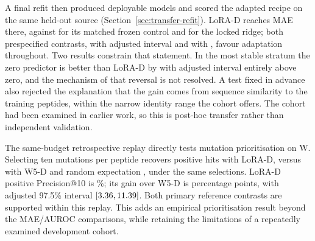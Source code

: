 A final refit then produced deployable models and scored the adapted recipe on the same held-out
source (Section~\ref{sec:transfer-refit}). LoRA-D reaches MAE \nTLoraMae{} there, against
\nTFrozenMae{} for its matched frozen control and \nTWfiveMae{} for the locked ridge; both
prespecified contrasts, \nTDeltaFrozen{} with adjusted interval \nTDeltaFrozenCI{} and
\nTDeltaWfive{} with \nTDeltaWfiveCI{}, favour adaptation throughout. Two results constrain that
statement. In the most stable stratum the zero predictor is better than LoRA-D by \nTGtFiveDelta{}
with adjusted interval \nTGtFiveCI{} entirely above zero, and the mechanism of that reversal is
not resolved. A test fixed in advance also rejected the explanation that the gain comes from
sequence similarity to the training peptides, within the narrow identity range the cohort offers.
The cohort had been examined in earlier work, so this is post-hoc transfer rather than independent
validation.

The same-budget retrospective replay directly tests mutation prioritisation on W. Selecting ten
mutations per peptide recovers \nPriorityLoraHits{} positive hits with LoRA-D, versus
\nPriorityWfiveHits{} with W5-D and random expectation \nPriorityRandomHits{}, under the same
\nPrioritySelections{} selections. LoRA-D positive Precision@10 is \nPriorityLoraPrecision\%;
its gain over W5-D is \nPriorityDeltaWfive{} percentage points, with adjusted 97.5\% interval
$[3.36, 11.39]{}$. Both primary reference contrasts are supported within this replay.
This adds an empirical prioritisation result beyond the MAE/AUROC comparisons, while retaining
the limitations of a repeatedly examined development cohort.

